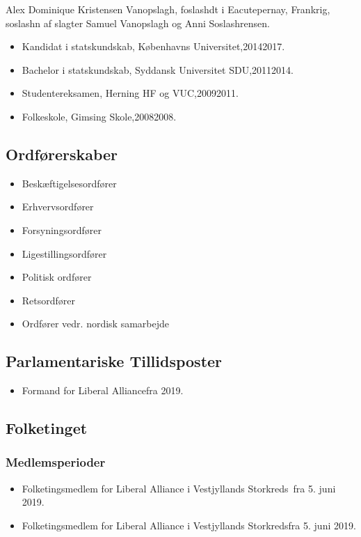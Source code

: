 \documentclass[11pt, a4paper]{awesome-cv}
\begin{document}
\makecvheader[R]
\makelettertitle
\begin{cvletter}
Alex Dominique Kristensen Vanopslagh, foslashdt i Eacutepernay, Frankrig, soslashn af slagter Samuel Vanopslagh og Anni Soslashrensen.

\begin{itemize}
\item Kandidat i statskundskab, Københavns Universitet,20142017.
\item Bachelor i statskundskab, Syddansk Universitet SDU,20112014.
\item Studentereksamen, Herning HF og VUC,20092011.
\item Folkeskole, Gimsing Skole,20082008.
\end{itemize}
\subsection*{Ordførerskaber}
\begin{itemize}
\item Beskæftigelsesordfører
\item Erhvervsordfører
\item Forsyningsordfører
\item Ligestillingsordfører
\item Politisk ordfører
\item Retsordfører
\item Ordfører vedr. nordisk samarbejde
\end{itemize}
\subsection*{Parlamentariske Tillidsposter}
\begin{itemize}
\item Formand for Liberal Alliancefra 2019.
\end{itemize}
\subsection*{Folketinget}
\subsubsection*{Medlemsperioder}
\begin{itemize}
\item Folketingsmedlem for Liberal Alliance i Vestjyllands Storkreds fra 5. juni 2019.
\item Folketingsmedlem for Liberal Alliance i Vestjyllands Storkredsfra 5. juni 2019.
\end{itemize}

\end{cvletter}
\end{document}
